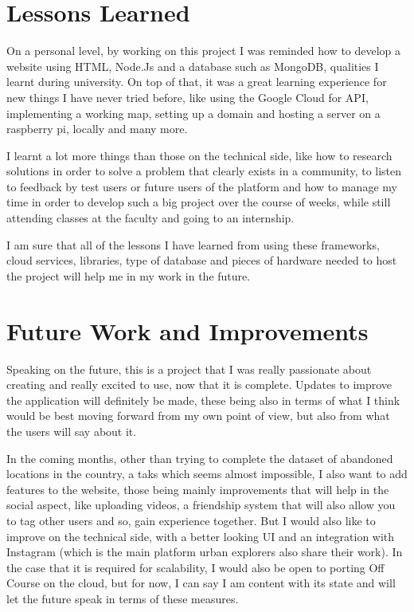 \documentclass[12pt,a4paper]{report}
\begin{document}
\section*{Lessons Learned}

On a personal level, by working on this project I was reminded how to develop a website using HTML, Node.Js and a database such as MongoDB, qualities I learnt during university. On top of that, it was a great learning experience for new things I have never tried before, like using the Google Cloud for API, implementing a working map, setting up a domain and hosting a server on a raspberry pi, locally and many more.

I learnt a lot more things than those on the technical side, like how to research solutions in order to solve a problem that clearly exists in a community, to listen to feedback by test users or future users of the platform and how to manage my time in order to develop such a big project over the course of weeks, while still attending classes at the faculty and going to an internship.

I am sure that all of the lessons I have learned from using these frameworks, cloud services, libraries, type of database and pieces of hardware needed to host the project will help me in my work in the future.

\section*{Future Work and Improvements}

Speaking on the future, this is a project that I was really passionate about creating and really excited to use, now that it is complete. Updates to improve the application will definitely be made, these being also in terms of what I think would be best moving forward from my own point of view, but also from what the users will say about it.

In the coming months, other than trying to complete the dataset of abandoned locations in the country, a taks which seems almost impossible, I also want to add features to the website, those being mainly improvements that will help in the social aspect, like uploading videos, a friendship system that will also allow you to tag other users and so, gain experience together. But I would also like to improve on the technical side, with a better looking UI and an integration with Instagram (which is the main platform urban explorers also share their work). In the case that it is required for scalability, I would also be open to porting Off Course on the cloud, but for now, I can say I am content with its state and will let the future speak in terms of these measures.
\end{document}
